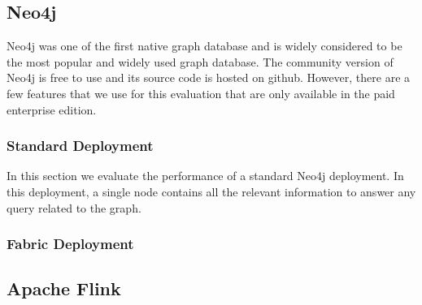 \subsection{Neo4j}\label{sec:neo4jCmp}
Neo4j\cite{neo4j} was one of the first native graph database and is widely
considered to be the most popular and widely used graph database. The community
version of Neo4j is free to use and its source code is hosted on github.
However, there are a few features that we use for this evaluation that are only
available in the paid enterprise edition.

\subsubsection{Standard Deployment}
In this section we evaluate the performance of a standard Neo4j deployment.
In this deployment, a single node contains all the relevant information to
answer any query related to the graph.
\subsubsection{Fabric Deployment}

\subsection{Apache Flink}\label{sec:flinkCmp}

